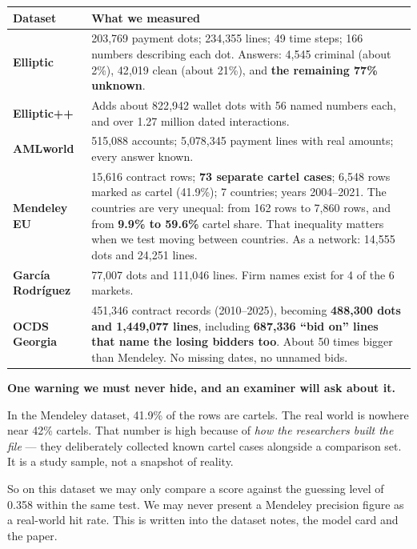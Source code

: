 \documentclass[11pt,a4paper]{article}
\begin{document}
\begin{longtable}{@{}p{4.3cm}p{11.2cm}@{}}
\toprule
\textbf{Dataset} & \textbf{What we measured} \\
\midrule
\endhead
\textbf{Elliptic} &
203{,}769 payment dots; 234{,}355 lines; 49 time steps; 166 numbers describing
each dot.
Answers: 4{,}545 criminal (about 2\%), 42{,}019 clean (about 21\%), and
\textbf{the remaining 77\% unknown}. \\
\addlinespace
\textbf{Elliptic++} &
Adds about 822{,}942 wallet dots with 56 named numbers each, and over 1.27
million dated interactions. \\
\addlinespace
\textbf{AMLworld} &
515{,}088 accounts; 5{,}078{,}345 payment lines with real amounts; every answer
known. \\
\addlinespace
\textbf{Mendeley EU} &
15{,}616 contract rows; \textbf{73 separate cartel cases}; 6{,}548 rows marked as
cartel (41.9\%); 7 countries; years 2004--2021.
The countries are very unequal: from 162 rows to 7{,}860 rows, and from
\textbf{9.9\% to 59.6\%} cartel share. That inequality matters when we test
moving between countries.
As a network: 14{,}555 dots and 24{,}251 lines. \\
\addlinespace
\textbf{García Rodríguez} &
77{,}007 dots and 111{,}046 lines. Firm names exist for 4 of the 6 markets. \\
\addlinespace
\textbf{OCDS Georgia} &
451{,}346 contract records (2010--2025), becoming
\textbf{488{,}300 dots and 1{,}449{,}077 lines}, including
\textbf{687{,}336 ``bid on'' lines that name the losing bidders too}.
About 50 times bigger than Mendeley. No missing dates, no unnamed bids. \\
\bottomrule
\end{longtable}

\begin{warnbox}
\textbf{One warning we must never hide, and an examiner will ask about it.}

In the Mendeley dataset, 41.9\% of the rows are cartels. The real world is
nowhere near 42\% cartels. That number is high because of \emph{how the
researchers built the file} --- they deliberately collected known cartel cases
alongside a comparison set. It is a study sample, not a snapshot of reality.

So on this dataset we may only compare a score against the guessing level of
0.358 within the same test. We may never present a Mendeley precision figure as a
real-world hit rate. This is written into the dataset notes, the model card and
the paper.
\end{warnbox}
\end{document}
